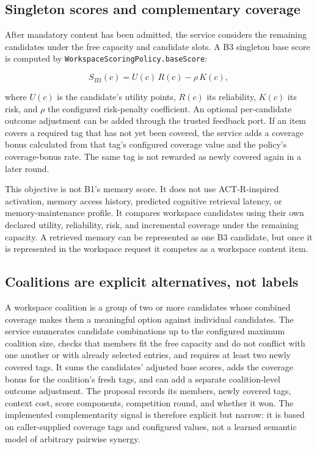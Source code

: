 \subsection{Singleton scores and complementary coverage}
\label{subsec:ch21-b3-scoring}

After mandatory content has been admitted, the service considers the remaining candidates under the free capacity and candidate slots. A B3 singleton base score is computed by \texttt{Workspace\allowbreak{}Scoring\allowbreak{}Policy.\allowbreak{}base\allowbreak{}Score}:

\[
S_{B3}(c) = U(c)\,R(c) - \rho\,K(c),
\]

where \(U(c)\) is the candidate's utility points, \(R(c)\) its reliability, \(K(c)\) its risk, and \(\rho\) the configured risk-penalty coefficient. An optional per-candidate outcome adjustment can be added through the trusted feedback port. If an item covers a required tag that has not yet been covered, the service adds a coverage bonus calculated from that tag's configured coverage value and the policy's coverage-bonus rate. The same tag is not rewarded as newly covered again in a later round.

This objective is not B1's memory score. It does not use ACT-R-inspired activation, memory access history, predicted cognitive retrieval latency, or memory-maintenance profile. It compares workspace candidates using their own declared utility, reliability, risk, and incremental coverage under the remaining capacity. A retrieved memory can be represented as one B3 candidate, but once it is represented in the workspace request it competes as a workspace content item.

\subsection{Coalitions are explicit alternatives, not labels}
\label{subsec:ch21-b3-coalitions}

A workspace coalition is a group of two or more candidates whose combined coverage makes them a meaningful option against individual candidates. The service enumerates candidate combinations up to the configured maximum coalition size, checks that members fit the free capacity and do not conflict with one another or with already selected entries, and requires at least two newly covered tags. It sums the candidates' adjusted base scores, adds the coverage bonus for the coalition's fresh tags, and can add a separate coalition-level outcome adjustment. The proposal records its members, newly covered tags, context cost, score components, competition round, and whether it won. The implemented complementarity signal is therefore explicit but narrow: it is based on caller-supplied coverage tags and configured values, not a learned semantic model of arbitrary pairwise synergy.


